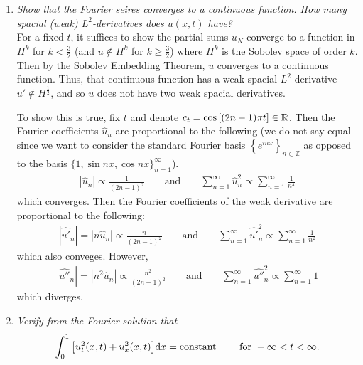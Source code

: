 \begin{enumerate}[\bf (a)]
    \item
        \emph{Show that the Fourier seires converges to a continuous function.  How many spacial (weak) $L^2$-derivatives does $u(x,t)$ have?} \\

        For a fixed $t$, it suffices to show the partial sums $u_N$ converge to a function in $H^k$ for $k < \frac{3}{2}$ (and $u \not\in H^k$ for $k \geq \frac{3}{2}$) where $H^k$ is the Sobolev space of order $k$.  Then by the Sobolev Embedding Theorem, $u$ converges to a continuous function.  Thus, that continuous function has a weak spacial $L^2$ derivative $u' \not\in H^{\frac{1}{2}}$, and so $u$ does not have two weak spacial derivatives.

        To show this is true, fix $t$ and denote $c_t = \cos\qty[\qty(2n-1)\pi t] \in \mathbb{R}$.  Then the Fourier coefficients $\hat{u}_n$ are proportional to the following (we do not say equal since we want to consider the standard Fourier basis $\left\{e^{inx}\right\}_{n\in\mathbb{Z}}$ as opposed to the basis $\big\{1, \sin nx, \cos nx\big\}_{n=1}^\infty$).
        \begin{align*}
            \left|\hat{u}_n\right| \propto \frac{1}{(2n-1)^2} \qquad \text{and} \qquad \sum_{n=1}^\infty \hat{u}_n^2 \propto \sum_{n=1}^\infty \frac{1}{n^4}
        \end{align*}
        which converges.  Then the Fourier coefficients of the weak derivative are proportional to the following:
        \begin{align*}
            \left|\hat{u'}_n\right| = \left|n\hat{u}_n\right| \propto \frac{n}{(2n-1)^2} \qquad \text{and} \qquad \sum_{n=1}^\infty \hat{u'}_n^2 \propto \sum_{n=1}^\infty \frac{1}{n^2}
        \end{align*}
        which also conveges.  However,
        \begin{align*}
            \left|\hat{u''}_n\right| = \left|n^2\hat{u}_n\right| \propto \frac{n^2}{(2n-1)^2} \qquad \text{and} \qquad \sum_{n=1}^\infty \hat{u''}_n^2 \propto \sum_{n=1}^\infty 1
        \end{align*}
        which diverges.
    \item
        \emph{Verify from the Fourier solution that $$\int_0^1\qty[u_t^2(x,t) + u_x^2(x,t)]\dd x = \text{constant} \qquad \text{ for } -\infty < t < \infty.$$}


\end{enumerate}
